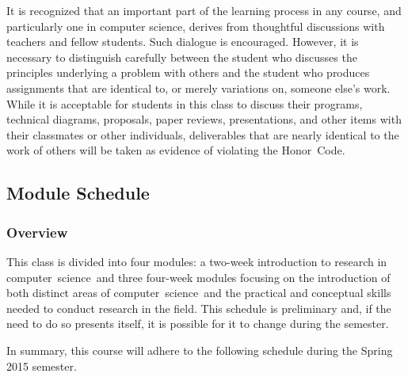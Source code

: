 \noindent It is recognized that an important part of the learning process in any course, and particularly one in
computer science, derives from thoughtful discussions with teachers and fellow students.  Such dialogue is encouraged.
However, it is necessary to distinguish carefully between the student who discusses the principles underlying a problem
with others and the student who produces assignments that are identical to, or merely variations on, someone else's
work.  While it is acceptable for students in this class to discuss their programs, technical diagrams, proposals, paper
reviews, presentations, and other items with their classmates or other individuals, deliverables that are nearly
identical to the work of others will be taken as evidence of violating the \mbox{Honor Code}.

\vspace{-.20in}
\subsection*{Module Schedule}

\subsubsection*{Overview}

This class is divided into four modules: a two-week introduction to research in \mbox{computer science and} three
four-week modules focusing on the introduction of both distinct areas of \mbox{computer science and} the practical and
conceptual skills needed to conduct research in the field.  This schedule is preliminary and, if the need to do so
presents itself, it is possible for it to change during the semester.

\noindent
In summary, this course will adhere to the following schedule during the Spring 2015 semester.

